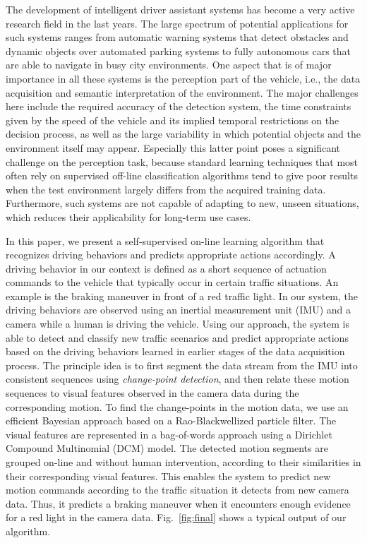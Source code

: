 The development of intelligent driver assistant systems has become a
very active research field in the last years. The large spectrum of
potential applications for such systems ranges from automatic warning
systems that detect obstacles and dynamic objects over automated
parking systems to fully autonomous cars that are able to navigate in
busy city environments. One aspect that is of major importance in all
these systems is the perception part of the vehicle, i.e., the data
acquisition and semantic interpretation of the environment. The major
challenges here include the required accuracy of the detection system,
the time constraints given by the speed of the vehicle and its implied
temporal restrictions on the decision process, as well as the large
variability in which potential objects and the environment itself may
appear. Especially this latter point poses a significant challenge on
the perception task, because standard learning techniques that most
often rely on supervised off-line classification algorithms tend to
give poor results when the test environment largely differs from the
acquired training data. Furthermore, such systems are not capable of
adapting to new, unseen situations, which reduces their applicability
for long-term use cases. 

In this paper, we present a self-supervised on-line learning algorithm
that recognizes driving behaviors and predicts appropriate actions
accordingly. A driving behavior in our context is defined as a short
sequence of actuation commands to the vehicle that typically occur in
certain traffic situations. An example is the braking maneuver in
front of a red traffic light. In our system, the driving behaviors are
observed using an inertial measurement unit (IMU) and a camera while a
human is driving the vehicle. Using our approach, the system is able
to detect and classify new traffic scenarios and predict appropriate
actions based on the driving behaviors learned in earlier stages of
the data acquisition process. The principle idea is to first segment
the data stream from the IMU into consistent sequences using
\emph{change-point detection}, and then relate these motion sequences
to visual features observed in the camera data during the
corresponding motion. To find the change-points in the motion data, we
use an efficient Bayesian approach based on a Rao-Blackwellized
particle filter. The visual features are represented in a bag-of-words
approach using a Dirichlet Compound Multinomial (DCM) model. The
detected motion segments are grouped on-line and without human
intervention, according to their similarities in their corresponding
visual features. This enables the system to predict new motion
commands according to the traffic situation it detects from new camera
data. Thus, it predicts a braking maneuver when it encounters enough
evidence for a red light in the camera data. Fig.~\ref{fig:final} shows a
typical output of our algorithm.


